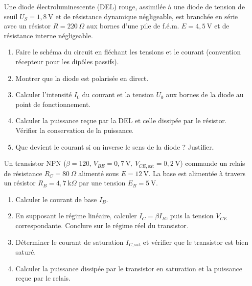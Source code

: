 \documentclass[11pt]{article}
\begin{document}
\begin{exercice}
Une diode électroluminescente (DEL) rouge, assimilée à une diode de tension de seuil $U_S = 1{,}8~\text{V}$ et de résistance dynamique négligeable, est branchée en série avec un résistor $R = 220~\Omega$ aux bornes d'une pile de f.é.m. $E = 4{,}5~\text{V}$ et de résistance interne négligeable.
\begin{enumerate}
\item Faire le schéma du circuit en fléchant les tensions et le courant (convention récepteur pour les dipôles passifs).
\item Montrer que la diode est polarisée en direct.
\item Calculer l'intensité $I_0$ du courant et la tension $U_0$ aux bornes de la diode au point de fonctionnement.
\item Calculer la puissance reçue par la DEL et celle dissipée par le résistor. Vérifier la conservation de la puissance.
\item Que devient le courant si on inverse le sens de la diode ? Justifier.
\end{enumerate}
\end{exercice}

\begin{exercice}
Un transistor NPN ($\beta = 120$, $V_{BE} = 0{,}7~\text{V}$, $V_{CE,\text{sat}} = 0{,}2~\text{V}$) commande un relais de résistance $R_C = 80~\Omega$ alimenté sous $E = 12~\text{V}$. La base est alimentée à travers un résistor $R_B = 4{,}7~\text{k}\Omega$ par une tension $E_B = 5~\text{V}$.
\begin{enumerate}
\item Calculer le courant de base $I_B$.
\item En supposant le régime linéaire, calculer $I_C = \beta I_B$, puis la tension $V_{CE}$ correspondante. Conclure sur le régime réel du transistor.
\item Déterminer le courant de saturation $I_{C,\text{sat}}$ et vérifier que le transistor est bien saturé.
\item Calculer la puissance dissipée par le transistor en saturation et la puissance reçue par le relais.
\end{enumerate}
\end{exercice}
\end{document}
